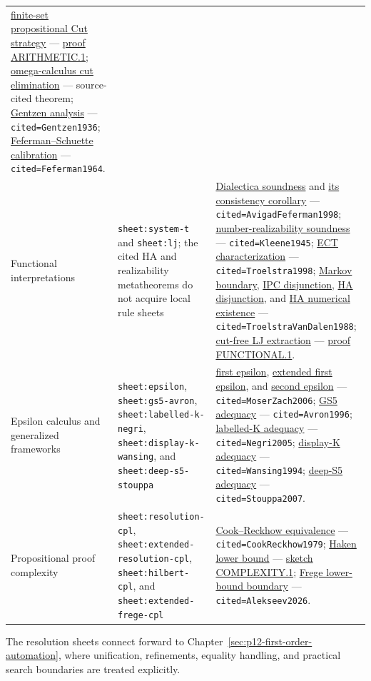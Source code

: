 \begin{landscape}
\begin{longtable}{@{}p{.82in}p{2.05in}p{4.95in}@{}}
\hyperref[thm:p07-prop-cut-termination]{finite-set propositional Cut strategy}
--- \hyperref[annex:p7.arithmetic.1]{proof ARITHMETIC.1};
\hyperref[thm:p07-omega-cut-elimination]{omega-calculus cut elimination}
--- source-cited theorem;
\hyperref[sec:normalization-curry-howard-04]{Gentzen analysis}
--- \texttt{cited=Gentzen1936};
\hyperref[thm:p07-feferman-schuette]{Feferman--Schuette calibration}
--- \texttt{cited=Feferman1964}. \\
\addlinespace
Functional interpretations &
\texttt{sheet:system-t} and \texttt{sheet:lj}; the cited HA and
realizability metatheorems do not acquire local rule sheets &
\hyperref[thm:p07-dialectica-soundness]{Dialectica soundness} and
\hyperref[thm:p07-dialectica-consistency]{its consistency corollary}
--- \texttt{cited=AvigadFeferman1998};
\hyperref[thm:p07-number-realizability-soundness]{number-realizability soundness}
--- \texttt{cited=Kleene1945};
\hyperref[thm:p07-ect-characterization]{ECT characterization}
--- \texttt{cited=Troelstra1998};
\hyperref[thm:p07-markov-realizability-boundary]{Markov boundary},
\hyperref[thm:p07-ipc-disjunction-property]{IPC disjunction},
\hyperref[thm:p07-ha-disjunction-property]{HA disjunction}, and
\hyperref[thm:p07-ha-numerical-existence]{HA numerical existence}
--- \texttt{cited=TroelstraVanDalen1988};
\hyperref[thm:p07-lj-disjunction-last-rule]{cut-free LJ extraction}
--- \hyperref[annex:p7.functional.1]{proof FUNCTIONAL.1}. \\
\addlinespace
Epsilon calculus and generalized frameworks &
\texttt{sheet:epsilon}, \texttt{sheet:gs5-avron},
\texttt{sheet:labelled-k-negri}, \texttt{sheet:display-k-wansing}, and
\texttt{sheet:deep-s5-stouppa} &
\hyperref[thm:p07-first-epsilon]{first epsilon},
\hyperref[thm:p07-extended-first-epsilon]{extended first epsilon}, and
\hyperref[thm:p07-second-epsilon]{second epsilon}
--- \texttt{cited=MoserZach2006};
\hyperref[thm:p07-gs5-adequacy]{GS5 adequacy}
--- \texttt{cited=Avron1996};
\hyperref[thm:p07-labelled-k-adequacy]{labelled-K adequacy}
--- \texttt{cited=Negri2005};
\hyperref[thm:p07-display-k-adequacy]{display-K adequacy}
--- \texttt{cited=Wansing1994};
\hyperref[thm:p07-deep-s5-adequacy]{deep-S5 adequacy}
--- \texttt{cited=Stouppa2007}. \\
\addlinespace
Propositional proof complexity &
\texttt{sheet:resolution-cpl}, \texttt{sheet:extended-resolution-cpl},
\texttt{sheet:hilbert-cpl}, and \texttt{sheet:extended-frege-cpl} &
\hyperref[thm:p07-cook-reckhow-np-conp]{Cook--Reckhow equivalence}
--- \texttt{cited=CookReckhow1979};
\hyperref[thm:p07-haken-resolution-lower-bound]{Haken lower bound}
--- \hyperref[annex:p7.complexity.1]{sketch COMPLEXITY.1};
\hyperref[thm:p07-frege-lower-bound-boundary]{Frege lower-bound boundary}
--- \texttt{cited=Alekseev2026}. \\
\bottomrule
\end{longtable}
\endgroup
\end{landscape}
\endgroup

The resolution sheets connect forward to
Chapter~\ref{sec:p12-first-order-automation}, where unification, refinements,
equality handling, and practical search boundaries are treated explicitly.
